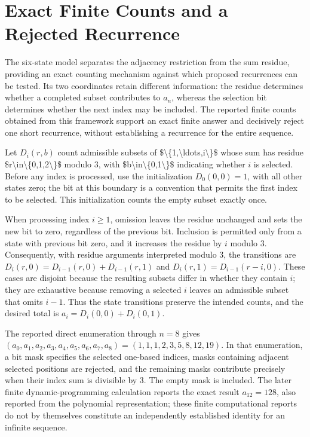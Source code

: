 \documentclass[11pt]{article}
\begin{document}
\section{Exact Finite Counts and a Rejected Recurrence}
The six-state model separates the adjacency restriction from the sum residue, providing an exact counting mechanism against which proposed recurrences can be tested. Its two coordinates retain different information: the residue determines whether a completed subset contributes to $a_n$, whereas the selection bit determines whether the next index may be included. The reported finite counts obtained from this framework support an exact finite answer and decisively reject one short recurrence, without establishing a recurrence for the entire sequence.

Let $D_i(r,b)$ count admissible subsets of \$\textbackslash{}\{1,\textbackslash{}ldots,i\textbackslash{}\}\$ whose sum has residue \$r\textbackslash{}in\textbackslash{}\{0,1,2\textbackslash{}\}\$ modulo $3$, with \$b\textbackslash{}in\textbackslash{}\{0,1\textbackslash{}\}\$ indicating whether $i$ is selected. Before any index is processed, use the initialization $D_0(0,0)=1$, with all other states zero; the bit at this boundary is a convention that permits the first index to be selected. This initialization counts the empty subset exactly once.

When processing index $i\geq1$, omission leaves the residue unchanged and sets the new bit to zero, regardless of the previous bit. Inclusion is permitted only from a state with previous bit zero, and it increases the residue by $i$ modulo $3$. Consequently, with residue arguments interpreted modulo $3$, the transitions are $D_i(r,0)=D_{i-1}(r,0)+D_{i-1}(r,1)$ and $D_i(r,1)=D_{i-1}(r-i,0)$. These cases are disjoint because the resulting subsets differ in whether they contain $i$; they are exhaustive because removing a selected $i$ leaves an admissible subset that omits $i-1$. Thus the state transitions preserve the intended counts, and the desired total is $a_i=D_i(0,0)+D_i(0,1)$.

The reported direct enumeration through $n=8$ gives $(a_0,a_1,a_2,a_3,a_4,a_5,a_6,a_7,a_8)=(1,1,1,2,3,5,8,12,19)$. In that enumeration, a bit mask specifies the selected one-based indices, masks containing adjacent selected positions are rejected, and the remaining masks contribute precisely when their index sum is divisible by $3$. The empty mask is included. The later finite dynamic-programming calculation reports the exact result $a_{12}=128$, also reported from the polynomial representation; these finite computational reports do not by themselves constitute an independently established identity for an infinite sequence.
\end{document}
